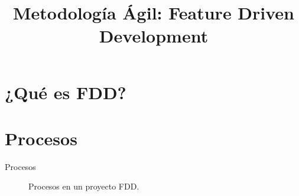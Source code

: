 \documentclass[12pt]{beamer}
\title{Metodología Ágil: Feature Driven Development}
\author[Author One at al.]{\makebox[0pt]{Miguel \and Sofía \and Pedro \and Victoria \and Lidia}}
\date{}
\begin{document}
\frame{}


\frame{\tableofcontents} %


\section{¿Qué es FDD?}

\section{Procesos}\label{proc}
\begin{frame}[fragile]{Procesos}
  \vspace{1cm}
  \begin{figure}[H]
    \centering
    \caption{Procesos en un proyecto FDD.}
\end{figure}
\end{frame}






\end{document}
